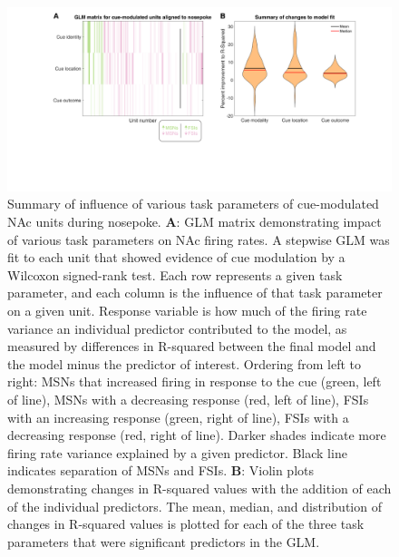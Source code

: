 \documentclass[11pt]{article}
\newcommand{\bsf}[1]{\textbf{#1}}
\begin{document}
{\begin{figure}[h]
\centering
\includegraphics[width=\textwidth]{Fig 10 - NP GLM.png}
\caption{Summary of influence of various task parameters of cue-modulated NAc
  units during nosepoke. \bsf{A}: GLM matrix demonstrating impact of various
  task parameters on NAc firing rates. A stepwise GLM was fit to each unit that
  showed evidence of cue modulation by a Wilcoxon signed-rank test. Each row
  represents a given task parameter, and each column is the influence of that
  task parameter on a given unit. Response variable is how much of the firing
  rate variance an individual predictor contributed to the model, as measured by
  differences in R-squared between the final model and the model minus the
  predictor of interest. Ordering from left to right: MSNs that increased firing
  in response to the cue (green, left of line), MSNs with a decreasing response
  (red, left of line), FSIs with an increasing response (green, right of line),
  FSIs with a decreasing response (red, right of line). Darker shades indicate
  more firing rate variance explained by a given predictor. Black line indicates
  separation of MSNs and FSIs. \bsf{B}: Violin plots demonstrating changes in
  R-squared values with the addition of each of the individual predictors. The
  mean, median, and distribution of changes in R-squared values is plotted for
  each of the three task parameters that were significant predictors in the
  GLM.}
\label{fig:NP_GLM}
\end{figure}

}
\end{document}
